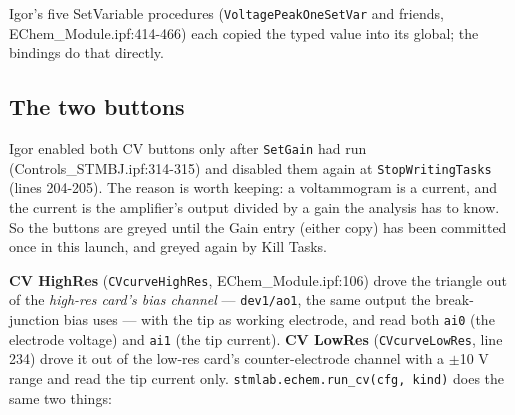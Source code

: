 Igor's five SetVariable procedures (\texttt{Voltage\discretionary{}{}{}Peak\discretionary{}{}{}One\discretionary{}{}{}Set\discretionary{}{}{}Var} and friends, EChem\_Module.ipf:414-466) each copied the typed value into its global; the bindings do that directly.

\subsection{The two buttons}

Igor enabled both CV buttons only after \texttt{Set\discretionary{}{}{}Gain} had run (Controls\_STMBJ.ipf:314-315) and disabled them again at \texttt{Stop\discretionary{}{}{}Writing\discretionary{}{}{}Tasks} (lines 204-205). The reason is worth keeping: a voltammogram is a current, and the current is the amplifier's output divided by a gain the analysis has to know. So the buttons are greyed until the Gain entry (either copy) has been committed once in this launch, and greyed again by Kill Tasks.

\textbf{CV HighRes} (\texttt{CVcurve\discretionary{}{}{}High\discretionary{}{}{}Res}, EChem\_Module.ipf:106) drove the triangle out of the \emph{high-res card's bias channel} --- \texttt{dev1/\discretionary{}{}{}ao1}, the same output the break-junction bias uses --- with the tip as working electrode, and read both \texttt{ai0} (the electrode voltage) and \texttt{ai1} (the tip current). \textbf{CV LowRes} (\texttt{CVcurve\discretionary{}{}{}Low\discretionary{}{}{}Res}, line 234) drove it out of the low-res card's counter-electrode channel with a $\pm$10 V range and read the tip current only. \texttt{stmlab.\discretionary{}{}{}echem.\discretionary{}{}{}run\_\discretionary{}{}{}cv(cfg,\discretionary{}{}{} kind)} does the same two things:

